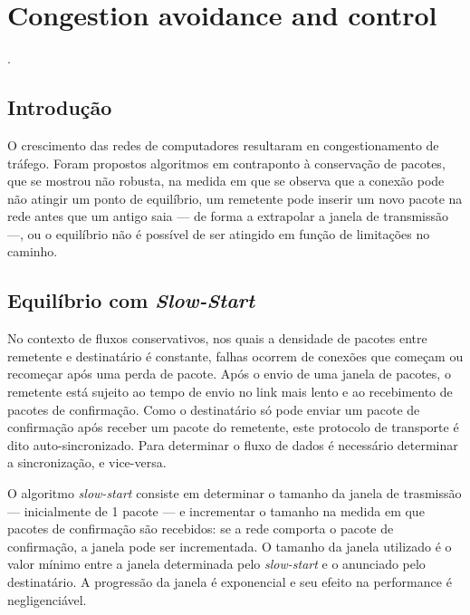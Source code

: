 
\chapter{Congestion avoidance and control}
 \cite{jacobson1988congestion}.


\section*{Introdução}

O crescimento das redes de computadores resultaram en congestionamento de 
tráfego. Foram propostos algoritmos em contraponto à conservação de pacotes, 
que se mostrou não robusta, na medida em que se observa que a conexão pode não 
atingir um ponto de equilíbrio, um remetente pode inserir um novo pacote na 
rede antes que um antigo saia --- de forma a extrapolar a janela de transmissão 
---, ou o equilíbrio não é possível de ser atingido em função de limitações no
caminho.


\section*{Equilíbrio com \textit{Slow-Start}}

No contexto de fluxos conservativos, nos quais a densidade de pacotes entre 
remetente e destinatário é constante, falhas ocorrem de conexões que começam ou 
recomeçar após uma perda de pacote. Após o envio de uma janela de pacotes, o 
remetente está sujeito ao tempo de envio no link mais lento e ao recebimento de 
pacotes de confirmação. Como o destinatário só pode enviar um pacote de 
confirmação após receber um pacote do remetente, este protocolo de transporte é 
dito auto-sincronizado. Para determinar o fluxo de dados é necessário 
determinar a sincronização, e vice-versa.

O algoritmo \textit{slow-start} consiste em determinar o tamanho da janela de 
trasmissão --- inicialmente de 1 pacote --- e incrementar o tamanho na medida 
em que pacotes de confirmação são recebidos: se a rede comporta o pacote de 
confirmação, a janela pode ser incrementada. O tamanho da janela utilizado é o 
valor mínimo entre a janela determinada pelo \textit{slow-start} e o anunciado 
pelo destinatário. A progressão da janela é exponencial e seu efeito na 
performance é negligenciável.


